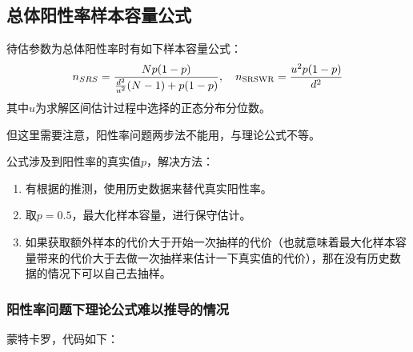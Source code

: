 \subsection{总体阳性率样本容量公式}
\begin{theorem}
	待估参数为总体阳性率时有如下样本容量公式：
	\begin{equation}
		n_{SRS}=\frac{Np(1-p)}{\frac{d^2}{u^2}(N-1)+p(1-p)},\quad n_{\text{SRSWR}}=\frac{u^2p(1-p)}{d^2}\notag
	\end{equation}
	其中$u$为求解区间估计过程中选择的正态分布分位数。
\end{theorem}
但这里需要注意，阳性率问题两步法不能用，与理论公式不等。\par
公式涉及到阳性率的真实值$p$，解决方法：
\begin{enumerate}
	\item 有根据的推测，使用历史数据来替代真实阳性率。
	\item 取$p=0.5$，最大化样本容量，进行保守估计。
	\item 如果获取额外样本的代价大于开始一次抽样的代价（也就意味着最大化样本容量带来的代价大于去做一次抽样来估计一下真实值的代价），那在没有历史数据的情况下可以自己去抽样。
\end{enumerate}
\subsubsection{阳性率问题下理论公式难以推导的情况}
蒙特卡罗，代码如下：
\inputminted[bgcolor=white, linenos, frame=single, numbersep=5pt, breaklines]{r}{sampling-method/SRS/sample_size_p.R}